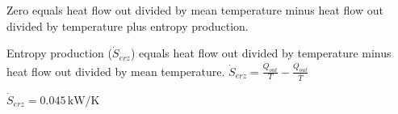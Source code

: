 Zero equals heat flow out divided by mean temperature minus heat flow out divided by temperature plus entropy production.  

Entropy production (\( \dot{S}_{erz} \)) equals heat flow out divided by temperature minus heat flow out divided by mean temperature.  
\( \dot{S}_{erz} = \frac{\dot{Q}_{out}}{T} - \frac{\dot{Q}_{out}}{\bar{T}} \)  

\( \dot{S}_{erz} = 0.045 \, \text{kW/K} \)